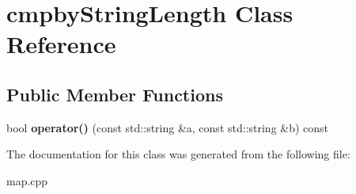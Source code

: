 \hypertarget{classcmpbyStringLength}{}\section{cmpby\+String\+Length Class Reference}
\label{classcmpbyStringLength}
\subsection*{Public Member Functions}
\begin{DoxyCompactItemize}
\item 
bool {\bfseries operator()} (const std\+::string \&a, const std\+::string \&b) const \hypertarget{classcmpbyStringLength_ae587b8ecc9a03ea49a172548f537085b}{}\label{classcmpbyStringLength_ae587b8ecc9a03ea49a172548f537085b}

\end{DoxyCompactItemize}


The documentation for this class was generated from the following file\+:\begin{DoxyCompactItemize}
\item 
map.\+cpp\end{DoxyCompactItemize}
